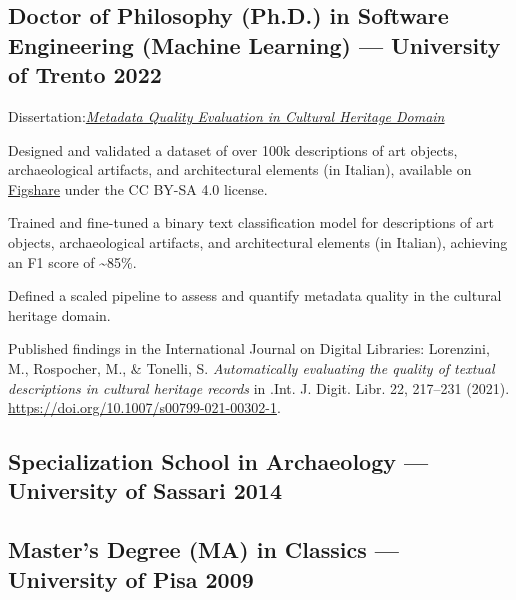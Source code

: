 \documentclass[letter,10pt]{article}
\begin{document}
\subsection{Doctor of Philosophy (Ph.D.) in Software Engineering (Machine Learning) --- University of Trento \hfill 2022}
Dissertation:\hyperlink{https://iris.unitn.it/handle/11572/330448}{\textit{Metadata Quality Evaluation in Cultural Heritage Domain}}
\begin{zitemize}
\item Designed and validated a dataset of over 100k descriptions of art objects, archaeological artifacts, and architectural elements (in Italian), available on \href{https://figshare.com/articles/dataset/Annotated_dataset_to_assess_the_accuracy_of_the_textual_description_of_cultural_heritage_records/13359104?file=25796018}{Figshare} under the CC BY-SA 4.0 license.
\item Trained and fine-tuned a binary text classification model for descriptions of art objects, archaeological artifacts, and architectural elements (in Italian), achieving an F1 score of \textasciitilde 85\%.
\item Defined a scaled pipeline to assess and quantify metadata quality in the cultural heritage domain.
\item Published findings in the International Journal on Digital Libraries: Lorenzini, M., Rospocher, M., \& Tonelli, S. \textit{Automatically evaluating the quality of textual descriptions in cultural heritage records} in .Int. J. Digit. Libr. 22, 217--231 (2021). \url{https://doi.org/10.1007/s00799-021-00302-1}.
\end{zitemize}




\subsection{{Specialization School in Archaeology --- University of Sassari \hfill 2014 }}
\begin{zitemize}

\end{zitemize}
\subsection{{Master's Degree (MA) in Classics --- University of Pisa \hfill 2009 }}
\begin{zitemize}

\end{zitemize}

\end{document}
